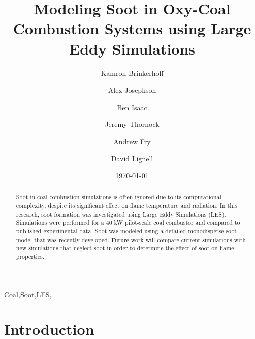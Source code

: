 \documentclass[review,3p]{elsarticle}
\begin{document}


\title{Modeling Soot in Oxy-Coal Combustion Systems using Large Eddy Simulations}

\author[byu]{Kamron Brinkerhoff}
\author[lanl]{Alex Josephson}
\author[llnl]{Ben Isaac}
\author[uofu]{Jeremy Thornock}
\author[byu]{Andrew Fry}
\author[byu,*]{David Lignell}

\address[byu]{350 CB, Brigham Young University, Provo, UT 84602, USA}
\address[lanl]{350 CB, Brigham Young University, Provo, UT 84602, USA}
\address[llnl]{350 CB, Brigham Young University, Provo, UT 84602, USA}
\address[uofu]{350 CB, Brigham Young University, Provo, UT 84602, USA}


\date{\today}


\begin{abstract} %
    Soot in coal combustion simulations is often ignored due to its computational complexity, despite its significant effect on flame temperature and radiation.  In this research, soot formation was investigated using Large Eddy Simulations (LES).  Simulations were performed for a 40 kW pilot-scale coal combustor and compared to published experimental data.  Soot was modeled using a detailed monodisperse soot model that was recently developed.  Future work will compare current simulations with new simulations that neglect soot in order to determine the effect of soot on flame properties.  
\end{abstract}

\begin{keyword}
    Coal\sep Soot\sep LES\sep 
\end{keyword}

\maketitle     

\linenumbers

\section{Introduction}
\end{document}
